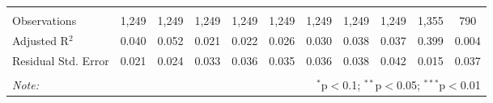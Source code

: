 \begin{table}[!htbp]
\begin{adjustbox}{width=1.35\textwidth}
\begin{tabular}{@{\extracolsep{5pt}}lcccccccccc}
\hline \\[-1.8ex] 
Observations & 1,249 & 1,249 & 1,249 & 1,249 & 1,249 & 1,249 & 1,249 & 1,249 & 1,355 & 790 \\ 
Adjusted R$^{2}$ & 0.040 & 0.052 & 0.021 & 0.022 & 0.026 & 0.030 & 0.038 & 0.037 & 0.399 & 0.004 \\ 
Residual Std. Error & 0.021 & 0.024 & 0.033 & 0.036 & 0.035 & 0.036 & 0.038 & 0.042 & 0.015 & 0.037 \\ 
\hline 
\hline \\[-1.8ex] 
\textit{Note:}  & \multicolumn{10}{r}{$^{*}$p$<$0.1; $^{**}$p$<$0.05; $^{***}$p$<$0.01} \\ 
\end{tabular} 
\end{adjustbox}
\end{table} 
